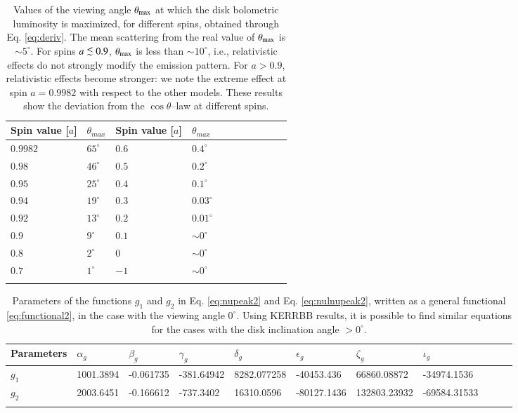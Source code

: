 \documentclass{aa}
\def\spose#1{\hbox to 0pt{#1\hss}}
\newcommand\lsim{\mathrel{\spose{\lower 3pt\hbox{$\mathchar"218$}}
     \raise 2.0pt\hbox{$\mathchar"13C$}}}
\begin{document}
\begin{table} 
\centering
\footnotesize
\begin{tabular}{lllllllllll}
\hline
Spin value [$a$] & $\theta_{max}$ & Spin value [$a$] & $\theta_{max}$\\
\hline
$0.9982$ & $65^{\circ}$ & $0.6$ & $0.4^{\circ}$ \\
$0.98$ & $46^{\circ}$ & $0.5$ & $0.2^{\circ}$ \\
$0.95$ & $25^{\circ}$ & $0.4$ & $0.1^{\circ}$ \\
$0.94$ & $19^{\circ}$ & $0.3$ & $0.03^{\circ}$ \\
$0.92$ & $13^{\circ}$ & $0.2$ & $0.01^{\circ}$ \\ 
$0.9$ & $9^{\circ}$ & $0.1$ & $\sim 0^{\circ}$ \\ 
$0.8$ & $2^{\circ}$ & $0$ & $\sim 0^{\circ}$ \\
$0.7$ & $1^{\circ}$ & $-1$ & $\sim 0^{\circ}$\\
\hline \\
\end{tabular}
\caption{
Values of the viewing angle $\theta_{\rm max}$ at which the disk bolometric luminosity is maximized, for different spins, obtained through Eq. \eqref{eq:deriv}. The mean scattering from the real value of $\theta_{\rm max}$ is $\sim 5^{\circ}$. For spins $a \lsim 0.9$, $\theta_{\rm max}$ is less than $\sim 10^{\circ}$, i.e., relativistic effects do not strongly modify the emission pattern. For $a > 0.9$, relativistic effects become stronger: we note the extreme effect at spin $a = 0.9982$ with respect to the other models. These results show the deviation from the $\cos \theta$--law at different spins.
} 
\label{tab:angmax}
\end{table}


\begin{table*} 
\centering
\footnotesize
\begin{tabular}{lllllllllll}
\hline
Parameters & $\alpha_g$ & $\beta_g$ & $\gamma_g$ & $\delta_g$ & $\epsilon_g$ & $\zeta_g$ & $\iota_g$ \\ 
\hline   
$g_1$ & 1001.3894 & -0.061735 & -381.64942 & 8282.077258 & -40453.436 & 66860.08872 & -34974.1536 \\
$g_2$ & 2003.6451 & -0.166612 & -737.3402 & 16310.0596 & -80127.1436 & 132803.23932 & -69584.31533 \\
\hline \\
\end{tabular}
\caption{Parameters of the functions $g_1$ and $g_2$ in Eq. \eqref{eq:nupeak2} and Eq. \eqref{eq:nulnupeak2}, written as a general functional \eqref{eq:functional2}, in the case with the viewing angle $0^{\circ}$. Using KERRBB results, it is possible to find similar equations for the cases with the disk inclination angle $> 0^{\circ}$.   
\label{ap:tab1}}
\end{table*}
\end{document}
